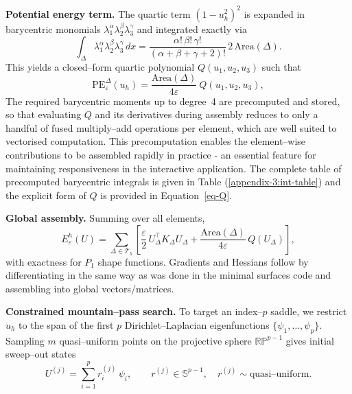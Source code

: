 \noindent\textbf{Potential energy term.}
The quartic term $(1-u_{h}^{2})^{2}$ is expanded in barycentric monomials $\lambda_{1}^{\alpha}\lambda_{2}^{\beta}\lambda_{3}^{\gamma}$ and integrated exactly via
\[
\int_{\Delta} \lambda_{1}^{\alpha}\lambda_{2}^{\beta}\lambda_{3}^{\gamma} \, dx
= \frac{\alpha! \, \beta! \, \gamma!}{(\alpha+\beta+\gamma+2)!} \, 2\,\mathrm{Area}(\Delta).
\]
This yields a closed--form quartic polynomial $Q(u_{1},u_{2},u_{3})$ such that
\[
\mathrm{PE}_{\varepsilon}^{\Delta}(u_{h})
= \frac{\mathrm{Area}(\Delta)}{4\varepsilon} \ Q(u_{1},u_{2},u_{3}),
\]
The required barycentric moments up to degree~4 are precomputed and stored, so that evaluating \(Q\) and its derivatives during assembly reduces to only a handful of fused multiply--add operations per element, which are well suited to vectorised computation. This precomputation enables the element--wise contributions to be assembled rapidly in practice - an essential feature for maintaining responsiveness in the interactive application. The complete table of precomputed barycentric integrals is given in Table (\ref{appendix-3:int-table}) and the explicit form of $Q$ is provided in Equation~\eqref{eq-Q}.

\noindent\textbf{Global assembly.}
Summing over all elements,
\[
E_{\varepsilon}^{h}(U)
= \sum_{\Delta \in \mathcal{T}_{h}}
\left[ \frac{\varepsilon}{2} \, U_{\Delta}^{\top} K_{\Delta} U_{\Delta}
+ \frac{\mathrm{Area}(\Delta)}{4\varepsilon} \, Q(U_{\Delta}) \right],
\]
with exactness for $P_{1}$ shape functions. Gradients and Hessians follow by differentiating in the same way as was done in the minimal surfaces code and assembling into global vectors/matrices.


\noindent\textbf{Constrained mountain--pass search.}
To target an index--$p$ saddle, we restrict $u_{h}$ to the span of the first $p$ Dirichlet--Laplacian eigenfunctions $\{\psi_{1},\dots,\psi_{p}\}$.  
Sampling $m$ quasi--uniform points on the projective sphere $\mathbb{RP}^{p-1}$ gives initial sweep--out states
\[
U^{(j)} = \sum_{i=1}^{p} r^{(j)}_{i} \, \psi_{i}, \qquad r^{(j)} \in \mathbb{S}^{p-1}, \quad r^{(j)} \sim \text{quasi--uniform}.
\]

